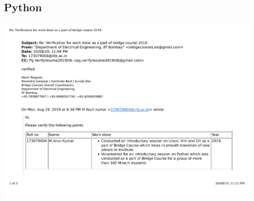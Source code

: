 \documentclass{article}
\begin{document}
	\subsection{Python}
		\includegraphics[page=1, scale=0.5]{proofs/bridge_courses.pdf}\\
\end{document}
